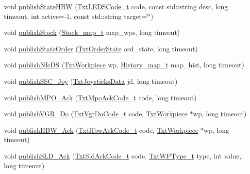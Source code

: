 \begin{DoxyCompactItemize}
\item 
void \hyperlink{classft_1_1_txt_mqtt_factory_client_a1f3c9b6117088049610042682bc21daa}{publish\+State\+H\+BW} (\hyperlink{namespaceft_a14147563037506fac6464a9f6bcbad40}{Txt\+L\+E\+D\+S\+Code\+\_\+t} code, const std\+::string desc, long timeout, int active=-\/1, const std\+::string target=\char`\"{}\char`\"{})
\item 
void \hyperlink{classft_1_1_txt_mqtt_factory_client_aa379fdca720ae6e258fdab746f22b5f2}{publish\+Stock} (\hyperlink{namespaceft_a3d5e802a7d78dac37b288630c9b21e64}{Stock\+\_\+map\+\_\+t} map\+\_\+wps, long timeout)
\item 
void \hyperlink{classft_1_1_txt_mqtt_factory_client_a10294cf5b852e5d6e24d7456853a3266}{publish\+State\+Order} (\hyperlink{structft_1_1_txt_order_state}{Txt\+Order\+State} ord\+\_\+state, long timeout)
\item 
void \hyperlink{classft_1_1_txt_mqtt_factory_client_a2fdd6b38c083c41c2da9f748a35b24c9}{publish\+Nfc\+DS} (\hyperlink{classft_1_1_txt_workpiece}{Txt\+Workpiece} wp, \hyperlink{namespaceft_aa7740d5a5a633c96d2063e7fd135cf89}{History\+\_\+map\+\_\+t} map\+\_\+hist, long timeout)
\item 
void \hyperlink{classft_1_1_txt_mqtt_factory_client_a1cdb5649368d07e48b05892ea54b812c}{publish\+S\+S\+C\+\_\+\+Joy} (\hyperlink{classft_1_1_txt_joysticks_data}{Txt\+Joysticks\+Data} jd, long timeout)
\item 
void \hyperlink{classft_1_1_txt_mqtt_factory_client_aae063650cf96166e8e7f468dc94af57c}{publish\+M\+P\+O\+\_\+\+Ack} (\hyperlink{namespaceft_a368e4d4d861f00b9f4faa23c052bdb46}{Txt\+Mpo\+Ack\+Code\+\_\+t} code, long timeout)
\item 
void \hyperlink{classft_1_1_txt_mqtt_factory_client_a337e7510ee005d530e78719c167a3f6a}{publish\+V\+G\+R\+\_\+\+Do} (\hyperlink{namespaceft_a91a43ab1445a680e5e113eec631eb030}{Txt\+Vgr\+Do\+Code\+\_\+t} code, \hyperlink{classft_1_1_txt_workpiece}{Txt\+Workpiece} $\ast$wp, long timeout)
\item 
void \hyperlink{classft_1_1_txt_mqtt_factory_client_ab984a39ea8b1145a8e9b0fd2c1061f3b}{publish\+H\+B\+W\+\_\+\+Ack} (\hyperlink{namespaceft_a79f8dea1d67f613a9366fec07e43e2ff}{Txt\+Hbw\+Ack\+Code\+\_\+t} code, \hyperlink{classft_1_1_txt_workpiece}{Txt\+Workpiece} $\ast$wp, long timeout)
\item 
void \hyperlink{classft_1_1_txt_mqtt_factory_client_a39939c7d24103887e27e26256703abd9}{publish\+S\+L\+D\+\_\+\+Ack} (\hyperlink{namespaceft_aee05f9d6ddbc6bb6add8c06f3e4067a0}{Txt\+Sld\+Ack\+Code\+\_\+t} code, \hyperlink{namespaceft_a2d5bf01b2da29de3c061682f3195b5b2}{Txt\+W\+P\+Type\+\_\+t} type, int value, long timeout)
\end{DoxyCompactItemize}
